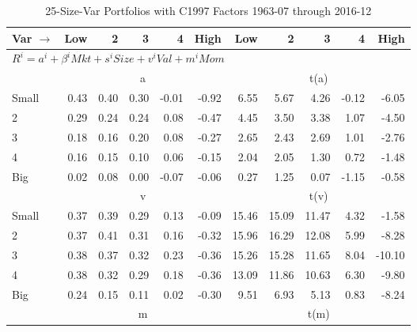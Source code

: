 
\begin{table}[!ht]
\centering
\caption{25-Size-Var Portfolios with C1997 Factors 1963-07 through 2016-12}
\begin{tabular}{lrrrrrrrrrr}
  \toprule
    Var $\rightarrow$ & Low & 2 & 3 & 4 & High & Low & 2 & 3 & 4 & High \\ 
  \midrule
  \multicolumn{11}{l}{$R^i=a^i+\beta^iMkt+s^iSize+v^iVal+m^iMom$} \\

  
    
      & \multicolumn{5}{c}{a} & \multicolumn{5}{c}{t(a)}
    
    \\
      \cmidrule(r){2-6} \cmidrule(r){7-11}

    Small   & 0.43  & 0.40  & 0.30  & -0.01  & -0.92  & 6.55  & 5.67  & 4.26  & -0.12  & -6.05  \\
         2  & 0.29  & 0.24  & 0.24  & 0.08  & -0.47  & 4.45  & 3.50  & 3.38  & 1.07  & -4.50  \\
         3  & 0.18  & 0.16  & 0.20  & 0.08  & -0.27  & 2.65  & 2.43  & 2.69  & 1.01  & -2.76  \\
         4  & 0.16  & 0.15  & 0.10  & 0.06  & -0.15  & 2.04  & 2.05  & 1.30  & 0.72  & -1.48  \\
    Big     & 0.02  & 0.08  & 0.00  & -0.07  & -0.06  & 0.27  & 1.25  & 0.07  & -1.15  & -0.58  \\

  
    
      & \multicolumn{5}{c}{v} & \multicolumn{5}{c}{t(v)}
    
    \\
      \cmidrule(r){2-6} \cmidrule(r){7-11}

    Small   & 0.37  & 0.39  & 0.29  & 0.13  & -0.09  & 15.46  & 15.09  & 11.47  & 4.32  & -1.58  \\
         2  & 0.37  & 0.41  & 0.31  & 0.16  & -0.32  & 15.96  & 16.29  & 12.08  & 5.99  & -8.28  \\
         3  & 0.38  & 0.37  & 0.32  & 0.23  & -0.36  & 15.26  & 15.28  & 11.65  & 8.04  & -10.10  \\
         4  & 0.38  & 0.32  & 0.29  & 0.18  & -0.36  & 13.09  & 11.86  & 10.63  & 6.30  & -9.80  \\
    Big     & 0.24  & 0.15  & 0.11  & 0.02  & -0.30  & 9.51  & 6.93  & 5.13  & 0.83  & -8.24  \\

  
    
      & \multicolumn{5}{c}{m} & \multicolumn{5}{c}{t(m)}
    

\end{tabular}
\end{table}
